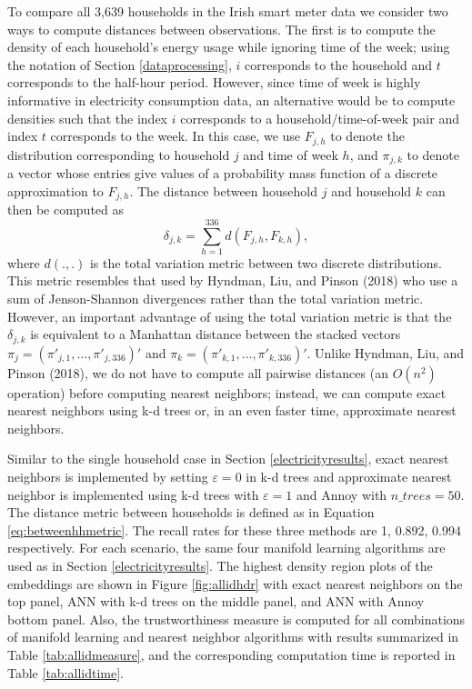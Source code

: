 \documentclass[12pt]{article}
\begin{document}
To compare all 3,639 households in the Irish smart meter data we consider two ways to compute distances between observations. The first is to compute the density of each household's energy usage while ignoring time of the week; using the notation of Section \ref{dataprocessing}, \(i\) corresponds to the household and \(t\) corresponds to the half-hour period. However, since time of week is highly informative in electricity consumption data, an alternative would be to compute densities such that the index \(i\) corresponds to a household/time-of-week pair and index \(t\) corresponds to the week. In this case, we use \(F_{j,h}\) to denote the distribution corresponding to household \(j\) and time of week \(h\), and \(\pi_{j,k}\) to denote a vector whose entries give values of a probability mass function of a discrete approximation to \(F_{j,h}\). The distance between household \(j\) and household \(k\) can then be computed as
\begin{equation}\label{eq:betweenhhmetric}
  \delta_{j,k}=\sum\limits_{h=1}^{336}d(F_{j,h},F_{k,h}),
\end{equation}
where \(d(.,.)\) is the total variation metric between two discrete distributions. This metric resembles that used by Hyndman, Liu, and Pinson (2018) who use a sum of Jenson-Shannon divergences rather than the total variation metric. However, an important advantage of using the total variation metric is that the \(\delta_{j,k}\) is equivalent to a Manhattan distance between the stacked vectors \(\pi_j=(\pi'_{j,1},\ldots,\pi'_{j,336})'\) and \(\pi_k=(\pi'_{k,1},\ldots,\pi'_{k,336})'\). Unlike Hyndman, Liu, and Pinson (2018), we do not have to compute all pairwise distances (an \(O(n^2)\) operation) before computing nearest neighbors; instead, we can compute exact nearest neighbors using k-d trees or, in an even faster time, approximate nearest neighbors.

Similar to the single household case in Section \ref{electricityresults}, exact nearest neighbors is implemented by setting \(\varepsilon=0\) in k-d trees and approximate nearest neighbor is implemented using k-d trees with \(\varepsilon=1\) and Annoy with \(\textit{n\_trees}=50\). The distance metric between households is defined as in Equation \eqref{eq:betweenhhmetric}. The recall rates for these three methods are 1, 0.892, 0.994 respectively. For each scenario, the same four manifold learning algorithms are used as in Section \ref{electricityresults}. The highest density region plots of the embeddings are shown in Figure \ref{fig:allidhdr} with exact nearest neighbors on the top panel, ANN with k-d trees on the middle panel, and ANN with Annoy bottom panel. Also, the trustworthiness measure is computed for all combinations of manifold learning and nearest neighbor algorithms with results summarized in Table \ref{tab:allidmeasure}, and the corresponding computation time is reported in Table \ref{tab:allidtime}.
\end{document}
